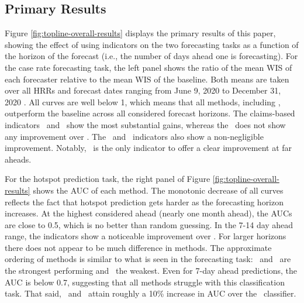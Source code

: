 \documentclass[9pt,twocolumn,twoside,lineno]{pnas-new}
\begin{document}
\subsection{Primary Results}

Figure \ref{fig:topline-overall-results} displays the primary results
of this paper, showing the effect of using indicators on the two
forecasting tasks as a function of the horizon of the forecast (i.e.,
the number of days ahead one is forecasting). For the case rate forecasting
task, the left panel shows the ratio of the mean
WIS 
of each forecaster relative to the mean WIS of the
baseline.   Both means are taken over all HRRs and forecast
dates ranging from June 9, 2020 to December 31, 2020 .
All curves are well below 1, which means that all methods, including \ar, outperform the baseline across all
considered forecast horizons. The claims-based
indicators \dv~and \chngcov~show the most substantial gains, whereas
the \chngcli~does not show any improvement over \ar.  The \fb~and
\gs~indicators also show a non-negligible improvement.  Notably,
\fb~is the only indicator to offer a clear improvement at far aheads.

For the hotspot prediction task, the right panel of Figure
\ref{fig:topline-overall-results} shows the AUC of each method.
The monotonic decrease of all curves reflects the fact that hotspot
prediction gets harder as the forecasting horizon increases. At the
highest considered ahead (nearly one month ahead), the AUCs are close
  to 0.5, which is no better than random guessing.
In the 7-14 day ahead range, the indicators show a noticeable
  improvement over \ar.  For larger horizons there does not
  appear to be much difference in methods.
The approximate ordering of methods is similar to what is seen
  in the forecasting task: \chngcov~and \dv~are the strongest
  performing and \ar~the weakest.
Even for 7-day ahead predictions, the AUC is below 0.7,
  suggesting that all methods struggle with this classification
  task. 
  That said, \dv~and \chngcov~attain roughly a 10\% increase in AUC
  over the \ar~classifier.
  
\end{document}
